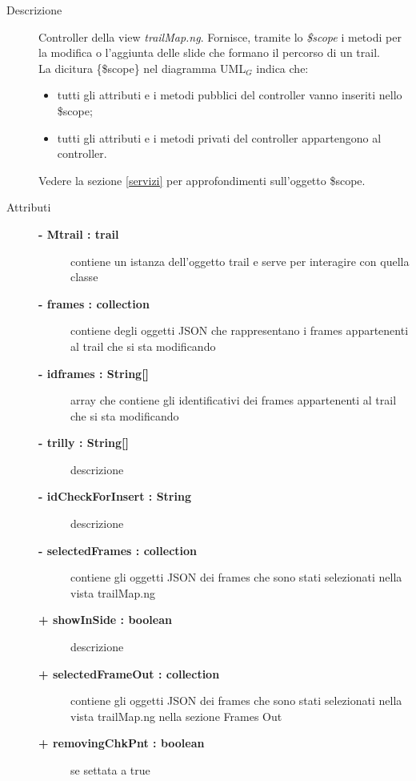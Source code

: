 \begin{description}
\item[Descrizione] \hfill
	Controller della view \textit{trailMap.ng}. Fornisce, tramite lo \textit{\$scope} i metodi per la modifica o l'aggiunta delle slide che formano il percorso di un trail. 
	\\ La dicitura \{\$scope\} nel diagramma UML$_G$ indica che:
\begin{itemize}
\item tutti gli attributi e i metodi pubblici del controller vanno inseriti nello \$scope;
\item tutti gli attributi e i metodi privati del controller appartengono al controller.
\end{itemize}
Vedere la sezione \ref{servizi} per approfondimenti sull'oggetto \$scope.
	
\item[Attributi] \hfill
	\begin{description}
		\item[\textbf{- Mtrail : trail			}] \hfill
			contiene un istanza dell'oggetto trail e serve per interagire con quella classe
		\item[\textbf{- frames : collection			}] \hfill
			contiene	 degli oggetti JSON che rappresentano i frames appartenenti al trail che si sta modificando
		\item[\textbf{- idframes : String[]			}] \hfill			
			array che contiene gli identificativi dei frames appartenenti al trail che si sta modificando		
		\item[\textbf{- trilly : String[]			}] \hfill			
			descrizione %
		\item[\textbf{- idCheckForInsert : String			}] \hfill			
			descrizione %
		\item[\textbf{- selectedFrames : collection			}] \hfill			
			contiene gli oggetti JSON dei frames che sono stati selezionati nella vista trailMap.ng %
		\item[\textbf{+ showInSide : boolean			}] \hfill			
			descrizione %
		\item[\textbf{+ selectedFrameOut : collection			}] \hfill			
			contiene gli oggetti JSON dei frames che sono stati selezionati nella vista trailMap.ng nella sezione Frames Out
		\item[\textbf{+ removingChkPnt : boolean			}] \hfill			
			se settata a true %
	\end{description}
	

\end{description}
